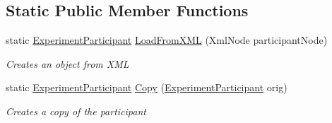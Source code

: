 \subsection*{Static Public Member Functions}
\begin{DoxyCompactItemize}
\item 
static \hyperlink{class_web_analyzer_1_1_models_1_1_base_1_1_experiment_participant}{Experiment\+Participant} \hyperlink{class_web_analyzer_1_1_models_1_1_base_1_1_experiment_participant_a015c0d2396bf07902e4d4ffb29816658}{Load\+From\+X\+M\+L} (Xml\+Node participant\+Node)
\begin{DoxyCompactList}\small\item\em Creates an object from X\+M\+L \end{DoxyCompactList}\item 
static \hyperlink{class_web_analyzer_1_1_models_1_1_base_1_1_experiment_participant}{Experiment\+Participant} \hyperlink{class_web_analyzer_1_1_models_1_1_base_1_1_experiment_participant_a519f759041e5db2488b821d2879d3199}{Copy} (\hyperlink{class_web_analyzer_1_1_models_1_1_base_1_1_experiment_participant}{Experiment\+Participant} orig)
\begin{DoxyCompactList}\small\item\em Creates a copy of the participant \end{DoxyCompactList}\end{DoxyCompactItemize}
